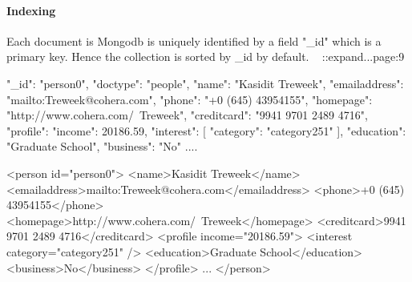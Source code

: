 \paragraph{Indexing} 
	Each document is Mongodb is uniquely identified by a field "\_id" which is a primary key. Hence the collection is sorted by \_id by default. ~\cite{nosql/comparision} ::expand...page:9

	


\begin{fakeJSON}[label=json,caption=Mongodb data representation of XMARk data]
{
   "_id": "person0",
   "doctype": "people",
   "name": "Kasidit Treweek",
   "emailaddress": "mailto:Treweek@cohera.com",
   "phone": "+0 (645) 43954155",
   "homepage": "http://www.cohera.com/~Treweek",
   "creditcard": "9941 9701 2489 4716",
   "profile": {
      "income": 20186.59,
      "interest": [{
         "category": "category251"
      }],
      "education": "Graduate School",
      "business": "No"
   }
   ....
}
\end{fakeJSON} 

\begin{fakeXML}[label=xml,caption=XMARK data with of \textit{person0}]

<person id="person0">
   <name>Kasidit Treweek</name>
   <emailaddress>mailto:Treweek@cohera.com</emailaddress>
   <phone>+0 (645) 43954155</phone>
   <homepage>http://www.cohera.com/~Treweek</homepage>
   <creditcard>9941 9701 2489 4716</creditcard>
   <profile income="20186.59">
      <interest category="category251" />
      <education>Graduate School</education>
      <business>No</business>
   </profile>
   ...
</person>
\end{fakeXML} 

	
	
